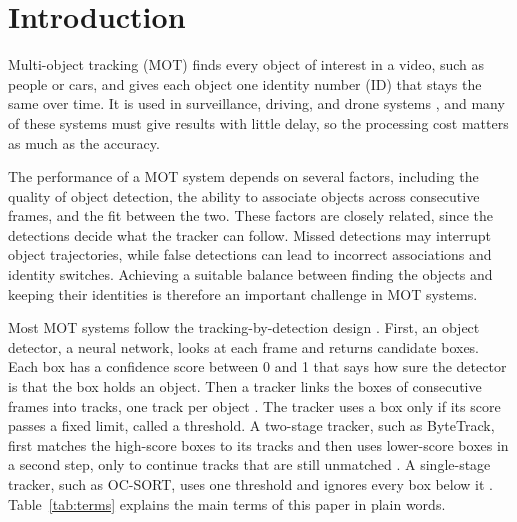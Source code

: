 \documentclass[pdflatex,sn-mathphys-num,iicol]{sn-jnl}
\begin{document}
\maketitle

\section{Introduction}\label{sec:intro}

Multi-object tracking (MOT) finds every object of interest in a video, such as people or cars,
and gives each object one identity number (ID) that stays the same over time. It is used in
surveillance, driving, and drone systems \cite{zhu2022visdrone,wu2022uavsurvey}, and many of these
systems must give results with little delay, so the processing cost matters as much as the
accuracy.

The performance of a MOT system depends on several factors, including the quality of object
detection, the ability to associate objects across consecutive frames, and the fit between the two.
These factors are closely related, since the detections decide what the tracker can follow. Missed
detections may interrupt object trajectories, while false detections can lead to incorrect
associations and identity switches. Achieving a suitable balance between finding the objects and
keeping their identities is therefore an important challenge in MOT systems.

Most MOT systems follow the tracking-by-detection design \cite{adzemovic2026survey}. First, an
object detector, a neural network, looks at each frame and returns candidate boxes. Each box has a
confidence score between 0 and 1 that says how sure the detector is that the box holds an object.
Then a tracker links the boxes of consecutive frames into tracks, one track per object
\cite{bewley2016sort,zhang2022bytetrack,cao2023ocsort}. The tracker uses a box only if its score
passes a fixed limit, called a threshold. A two-stage tracker, such as ByteTrack, first matches the
high-score boxes to its tracks and then uses lower-score boxes in a second step, only to continue
tracks that are still unmatched \cite{zhang2022bytetrack}. A single-stage tracker, such as OC-SORT,
uses one threshold and ignores every box below it \cite{cao2023ocsort}. Table~\ref{tab:terms}
explains the main terms of this paper in plain words.
\end{document}
